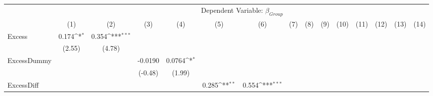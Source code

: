 {
\def\sym#1{\ifmmode^{#1}\else\(^{#1}\)\fi}
\begin{tabular}{l*{14}{c}}
\hline\hline
                &\multicolumn{14}{c}{Dependent Variable: $ \beta_{Group} $ }                                                                                                                                                                                                              \\\cmidrule(lr){2-15}
                &\multicolumn{1}{c}{(1)}         &\multicolumn{1}{c}{(2)}         &\multicolumn{1}{c}{(3)}         &\multicolumn{1}{c}{(4)}         &\multicolumn{1}{c}{(5)}         &\multicolumn{1}{c}{(6)}         &\multicolumn{1}{c}{(7)}         &\multicolumn{1}{c}{(8)}         &\multicolumn{1}{c}{(9)}         &\multicolumn{1}{c}{(10)}         &\multicolumn{1}{c}{(11)}         &\multicolumn{1}{c}{(12)}         &\multicolumn{1}{c}{(13)}         &\multicolumn{1}{c}{(14)}         \\
\hline
Excess          &    0.174\sym{*}  &    0.354\sym{***}&                  &                  &                  &                  &                  &                  &                  &                  &                  &                  &                  &                  \\
                &   (2.55)         &   (4.78)         &                  &                  &                  &                  &                  &                  &                  &                  &                  &                  &                  &                  \\
[1em]
ExcessDummy     &                  &                  &  -0.0190         &   0.0764\sym{*}  &                  &                  &                  &                  &                  &                  &                  &                  &                  &                  \\
                &                  &                  &  (-0.48)         &   (1.99)         &                  &                  &                  &                  &                  &                  &                  &                  &                  &                  \\
[1em]
ExcessDiff      &                  &                  &                  &                  &    0.285\sym{**} &    0.554\sym{***}&                  &                  &                  &                  &                  &                  &                  &                  \\

\end{tabular}}
